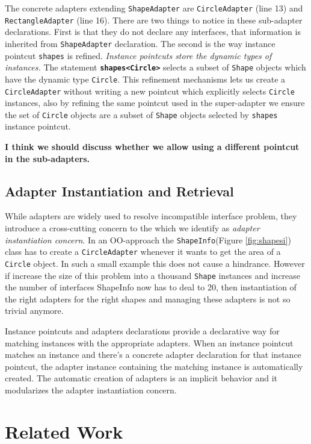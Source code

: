 \documentclass{llncs}
\begin{document}
The concrete adapters extending \texttt{ShapeAdapter} are \texttt{CircleAdapter} (line 13) and \texttt{RectangleAdapter} (line 16). There are two things to notice in these sub-adapter declarations. First is that they do not declare any interfaces, that information is inherited from \texttt{ShapeAdapter} declaration. The second is the way instance pointcut \texttt{shapes} is refined. \emph{Instance pointcuts store the dynamic types of instances.} The statement \texttt{\textbf{shapes<Circle>}} selects a subset of \texttt{Shape} objects which have the dynamic type \texttt{Circle}. This refinement mechanisms lets us create a \texttt{CircleAdapter} without writing a new pointcut which explicitly selects \texttt{Circle} instances, also by refining the same pointcut used in the super-adapter we ensure the set of \texttt{Circle} objects are a subset of \texttt{Shape} objects selected by \texttt{shapes} instance pointcut.

\textbf{\textcolor[rgb]{1,0,0}{I think we should discuss whether we allow using a different pointcut in the sub-adapters.}}

\subsection{Adapter Instantiation and Retrieval}
While adapters are widely used to resolve incompatible interface problem, they introduce a cross-cutting concern to the which we identify as \emph{adapter instantiation concern}. In an OO-approach  the \texttt{ShapeInfo}(Figure \ref{fig:shapesi}) class has to create a \texttt{CircleAdapter} whenever it wants to get the area of a \texttt{Circle} object. In such a small example this does not cause a hindrance. However if increase the size of this problem into a thousand \texttt{Shape} instances and increase the number of interfaces ShapeInfo now has to deal to 20, then instantiation of the right adapters for the right shapes and managing these adapters is not so trivial anymore. 

Instance pointcuts and adapters declarations provide a declarative way for matching instances with the appropriate adapters. When an instance pointcut matches an instance and there's a concrete adapter declaration for that instance pointcut, the adapter instance containing the matching instance is automatically created. The automatic creation of adapters is an implicit behavior and it modularizes the adapter instantiation concern. 


\section{Related Work}
\end{document}
